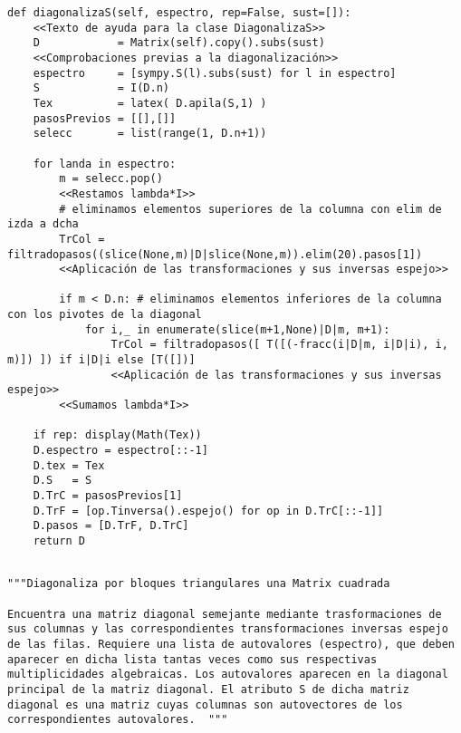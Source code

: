\documentclass[11pt]{report}
\begin{document}
\begin{verbatim}
def diagonalizaS(self, espectro, rep=False, sust=[]):
    <<Texto de ayuda para la clase DiagonalizaS>>
    D            = Matrix(self).copy().subs(sust)
    <<Comprobaciones previas a la diagonalización>>
    espectro     = [sympy.S(l).subs(sust) for l in espectro]    
    S            = I(D.n)
    Tex          = latex( D.apila(S,1) )
    pasosPrevios = [[],[]]
    selecc       = list(range(1, D.n+1))

    for landa in espectro:
        m = selecc.pop()
        <<Restamos lambda*I>>
        # eliminamos elementos superiores de la columna con elim de izda a dcha
        TrCol = filtradopasos((slice(None,m)|D|slice(None,m)).elim(20).pasos[1])
        <<Aplicación de las transformaciones y sus inversas espejo>>
        
        if m < D.n: # eliminamos elementos inferiores de la columna con los pivotes de la diagonal
            for i,_ in enumerate(slice(m+1,None)|D|m, m+1):
                TrCol = filtradopasos([ T([(-fracc(i|D|m, i|D|i), i, m)]) ]) if i|D|i else [T([])]
                <<Aplicación de las transformaciones y sus inversas espejo>>     
        <<Sumamos lambda*I>>
                    
    if rep: display(Math(Tex))
    D.espectro = espectro[::-1]
    D.tex = Tex
    D.S   = S
    D.TrC = pasosPrevios[1]
    D.TrF = [op.Tinversa().espejo() for op in D.TrC[::-1]]
    D.pasos = [D.TrF, D.TrC]
    return D
    
\end{verbatim}

\begin{verbatim}
"""Diagonaliza por bloques triangulares una Matrix cuadrada

Encuentra una matriz diagonal semejante mediante trasformaciones de
sus columnas y las correspondientes transformaciones inversas espejo
de las filas. Requiere una lista de autovalores (espectro), que deben
aparecer en dicha lista tantas veces como sus respectivas
multiplicidades algebraicas. Los autovalores aparecen en la diagonal
principal de la matriz diagonal. El atributo S de dicha matriz
diagonal es una matriz cuyas columnas son autovectores de los
correspondientes autovalores.  """
\end{verbatim}
\end{document}
